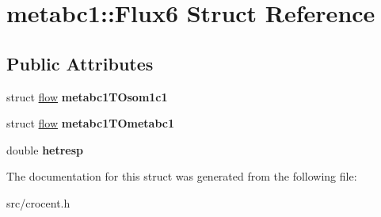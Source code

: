 \hypertarget{structmetabc1_1_1_flux6}{\section{metabc1\-:\-:Flux6 Struct Reference}
\label{structmetabc1_1_1_flux6}
}
\subsection*{Public Attributes}
\begin{DoxyCompactItemize}
\item 
\hypertarget{structmetabc1_1_1_flux6_a6935cc1011f77f3b315f52e29df96918}{struct \hyperlink{structflow}{flow} {\bfseries metabc1\-T\-Osom1c1}}\label{structmetabc1_1_1_flux6_a6935cc1011f77f3b315f52e29df96918}

\item 
\hypertarget{structmetabc1_1_1_flux6_a17b5d06cfdad171e3b1e4e8f7cb13cbd}{struct \hyperlink{structflow}{flow} {\bfseries metabc1\-T\-Ometabc1}}\label{structmetabc1_1_1_flux6_a17b5d06cfdad171e3b1e4e8f7cb13cbd}

\item 
\hypertarget{structmetabc1_1_1_flux6_a194c475b68f313c492d42750321f6fc1}{double {\bfseries hetresp}}\label{structmetabc1_1_1_flux6_a194c475b68f313c492d42750321f6fc1}

\end{DoxyCompactItemize}


The documentation for this struct was generated from the following file\-:\begin{DoxyCompactItemize}
\item 
src/crocent.\-h\end{DoxyCompactItemize}
